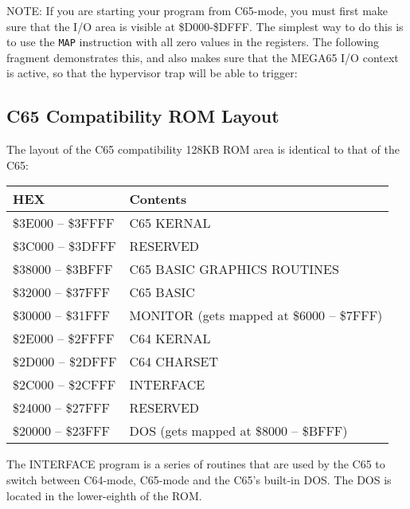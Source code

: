 NOTE: If you are starting your program from C65-mode, you must first make
sure that the I/O area is visible at \$D000-\$DFFF.  The simplest way to do
this is to use the {\tt MAP} instruction with all zero values in the registers.
The following fragment demonstrates this, and also makes sure that the MEGA65 I/O
context is active, so that the hypervisor trap will be able to trigger:



\subsection{C65 Compatibility ROM Layout}

The layout of the C65 compatibility 128KB ROM area is identical to that of the C65:

\begin{center}
  {\ttfamily
  \setlength{\tabcolsep}{3pt}
  \begin{tabular}{|l|l|}
  \hline
  {\bf{HEX}} & {\bf{Contents}} \\
  \hline
  \$3E000 -- \$3FFFF & C65 KERNAL \\
  \hline
  \$3C000 -- \$3DFFF & RESERVED \\
  \hline
  \$38000 -- \$3BFFF & C65 BASIC GRAPHICS ROUTINES \\
  \hline
  \$32000 -- \$37FFF & C65 BASIC \\
  \hline
  \$30000 -- \$31FFF & MONITOR (gets mapped at \$6000 -- \$7FFF) \\
  \hline
  \$2E000 -- \$2FFFF & C64 KERNAL \\
  \hline
  \$2D000 -- \$2DFFF & C64 CHARSET \\
  \hline
  \$2C000 -- \$2CFFF & INTERFACE \\
  \hline
  \$24000 -- \$27FFF & RESERVED \\
  \hline
  \$20000 -- \$23FFF & DOS (gets mapped at \$8000 -- \$BFFF) \\
  \hline
  \end{tabular}
  }
\end{center}

The INTERFACE program is a series of routines that are used by the C65
to switch between C64-mode, C65-mode and the C65's built-in DOS.  The
DOS is located in the lower-eighth of the ROM.




